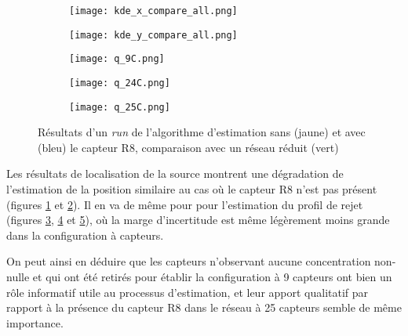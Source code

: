 \begin{figure}[h!]
	\centering
	\begin{subfigure}[t]{0.5\textwidth}
		\centering
		\texttt{[image: kde\_x\_compare\_all.png]}
		\caption{}
		\label{kde_x_all}
	\end{subfigure}%
	\begin{subfigure}[t]{0.5\textwidth}
		\centering
		\texttt{[image: kde\_y\_compare\_all.png]}
		\caption{}
		\label{kde_y_all}
	\end{subfigure}
	\begin{subfigure}[t]{0.33\textwidth}
		\centering
		\texttt{[image: q\_9C.png]}
		\caption{}
		\label{q_9C}
	\end{subfigure}%
	\begin{subfigure}[t]{0.33\textwidth}
		\centering
		\texttt{[image: q\_24C.png]}
		\caption{}
		\label{q_24C}
	\end{subfigure}%
	\begin{subfigure}[t]{0.33\textwidth}
		\centering
		\texttt{[image: q\_25C.png]}
		\caption{}
		\label{q_25C}
	\end{subfigure}
	\caption{Résultats d'un \textit{run} de l'algorithme d'estimation sans (jaune) et avec (bleu) le capteur R8, comparaison avec un réseau réduit (vert)}
	\label{}
\end{figure}



\newpage Les résultats de  localisation de la source montrent une dégradation de l'estimation de la position similaire au cas où le capteur R8 n'est pas présent (figures \ref{kde_x_all} et \ref{kde_y_all}). Il en va de même pour pour l'estimation du profil de rejet (figures \ref{q_9C}, \ref{q_24C} et \ref{q_25C}), où la marge d'incertitude est même légèrement moins grande dans la configuration à capteurs. 

On peut ainsi en déduire que les capteurs n'observant aucune concentration  non-nulle et qui ont été retirés pour établir la configuration à 9 capteurs ont bien un rôle informatif utile au processus d'estimation, et leur apport qualitatif par rapport à la présence du capteur R8 dans le réseau à 25 capteurs semble de même importance.\\

